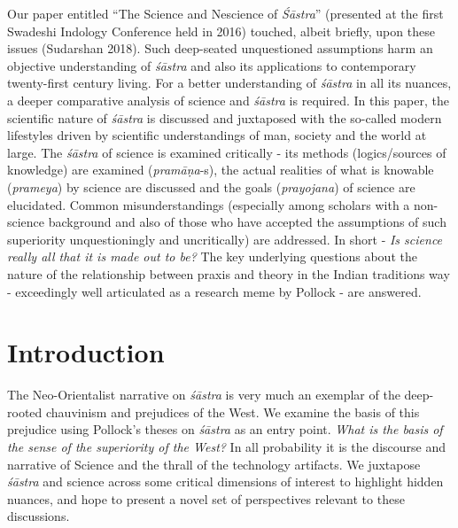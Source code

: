 Our paper entitled “The Science and Nescience of \textit{Śāstra}” (presented at the first Swadeshi Indology Conference held in 2016) touched, albeit briefly, upon these issues (Sudarshan 2018). Such deep-seated unquestioned assumptions harm an objective understanding of \textit{śāstra} and also its applications to contemporary twenty-first century living. For a better understanding of \textit{śāstra} in all its nuances, a deeper comparative analysis of science and \textit{śāstra} is required. In this paper, the scientific nature of \textit{śāstra} is discussed and juxtaposed with the so-called modern lifestyles driven by scientific understandings of man, society and the world at large. The \textit{śāstra} of science is examined critically - its methods (logics/sources of knowledge) are examined (\textit{pramāṇa}-s), the actual realities of what is knowable (\textit{prameya}) by science are discussed and the goals (\textit{prayojana}) of science are elucidated. Common misunderstandings (especially among scholars with a non-science background and also of those who have accepted the assumptions of such superiority unquestioningly and uncritically) are addressed. In short - \textit{Is science really all that it is made out to be?} The key underlying questions about the nature of the relationship between praxis and theory in the Indian traditions way - exceedingly well articulated as a research meme by Pollock  - are answered.


\section*{Introduction}

The Neo-Orientalist narrative on \textit{śāstra} is very much an exemplar of the deep-rooted chauvinism and prejudices of the West. We examine the basis of this prejudice using Pollock’s theses on \textit{śāstra} as an entry point. \textit{What is the basis of the sense of the superiority of the West?} In all probability it is the discourse and narrative of Science and the thrall of the technology artifacts. We juxtapose \textit{śāstra} and science across some critical dimensions of interest to highlight hidden nuances, and hope to present a novel set of perspectives relevant to these discussions.

